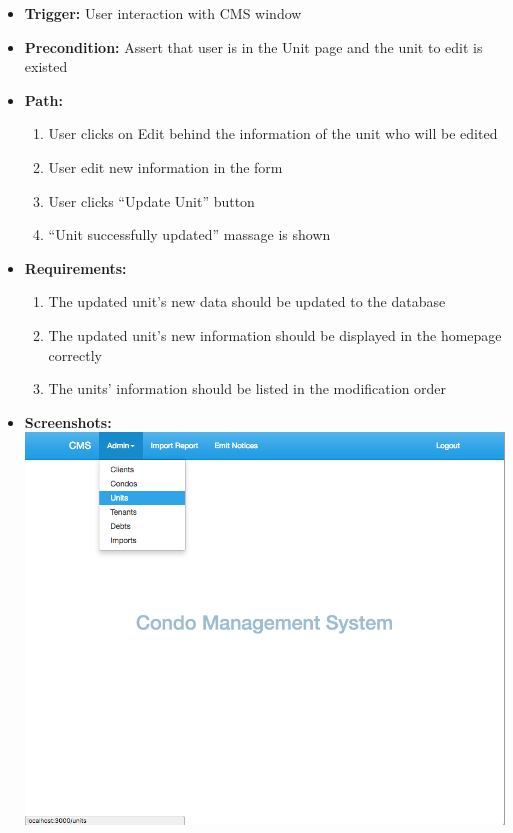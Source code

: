 \begin{itemize}
  \item[] \textbf{Trigger:} User interaction with CMS window
  \item[] \textbf{Precondition:} Assert that user is in the Unit page and the unit to edit is existed
  \item[] \textbf{Path:}
    \begin{enumerate}
      \item User clicks on Edit behind the information of the unit who will be edited
      \item User edit new information in the form
      \item User clicks ``Update Unit'' button
      \item ``Unit successfully updated'' massage is shown
    \end{enumerate}
  \item[] \textbf{Requirements:}
    \begin{enumerate}
      \item The updated unit’s new data should be updated to the database
      \item The updated unit’s new information should be displayed in the homepage correctly
      \item The units’ information should be listed in the modification order
    \end{enumerate}
  \item[] \textbf{Screenshots:}\\
    \includegraphics[scale=0.25]{./images/ss/unit/edit/1.png}

\end{itemize}
